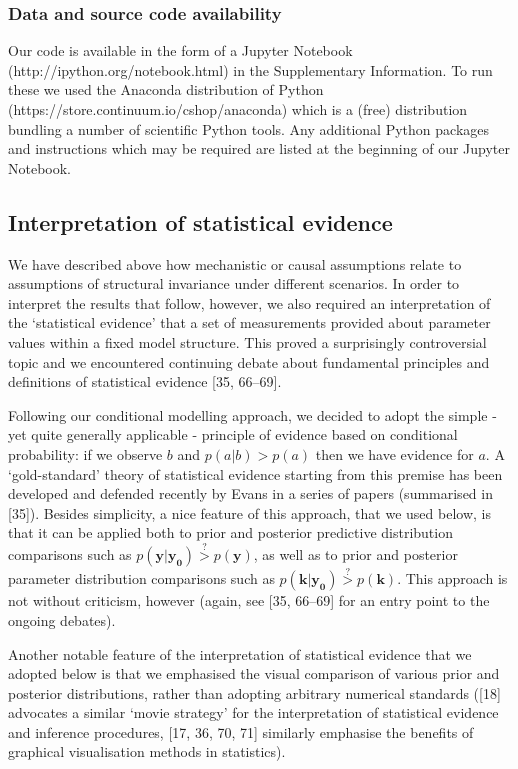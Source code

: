 \documentclass[10pt,letterpaper]{article}
\begin{document}
\subsubsection{Data and source code
availability}\label{data-and-source-code-availability}

Our code is available in the form of a Jupyter Notebook
(http://ipython.org/notebook.html) in the Supplementary Information. To
run these we used the Anaconda distribution of Python
(https://store.continuum.io/cshop/anaconda) which is a (free)
distribution bundling a number of scientific Python tools. Any
additional Python packages and instructions which may be required are
listed at the beginning of our Jupyter Notebook.

\subsection{Interpretation of statistical
evidence}\label{interpretation-of-statistical-evidence}

We have described above how mechanistic or causal assumptions relate to
assumptions of structural invariance under different scenarios. In order
to interpret the results that follow, however, we also required an
interpretation of the `statistical evidence' that a set of measurements
provided about parameter values within a fixed model structure. This
proved a surprisingly controversial topic and we encountered continuing
debate about fundamental principles and definitions of statistical
evidence {[}35, 66--69{]}.

Following our conditional modelling approach, we decided to adopt the
simple - yet quite generally applicable - principle of evidence based on
conditional probability: if we observe \(b\) and \(p(a|b) > p(a)\) then
we have evidence for \(a\). A `gold-standard' theory of statistical
evidence starting from this premise has been developed and defended
recently by Evans in a series of papers (summarised in {[}35{]}).
Besides simplicity, a nice feature of this approach, that we used below,
is that it can be applied both to prior and posterior predictive
distribution comparisons such as
\(p(\mathbf{y}|\mathbf{y_0}) \overset{?}{>} p(\mathbf{y})\), as well as
to prior and posterior parameter distribution comparisons such as
\(p(\mathbf{k}|\mathbf{y_0}) \overset{?}{>} p(\mathbf{k})\). This
approach is not without criticism, however (again, see {[}35, 66--69{]}
for an entry point to the ongoing debates).

Another notable feature of the interpretation of statistical evidence
that we adopted below is that we emphasised the visual comparison of
various prior and posterior distributions, rather than adopting
arbitrary numerical standards ({[}18{]} advocates a similar `movie
strategy' for the interpretation of statistical evidence and inference
procedures, {[}17, 36, 70, 71{]} similarly emphasise the benefits of
graphical visualisation methods in statistics).
\end{document}
